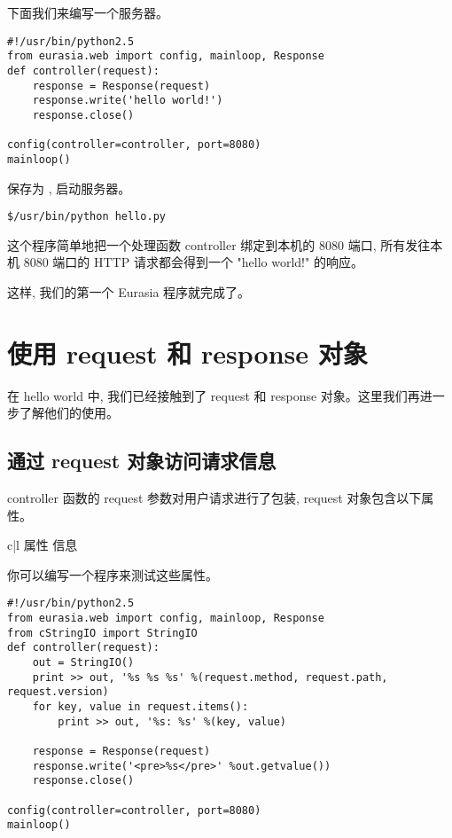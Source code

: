 \documentclass{manual}
\begin{document}
下面我们来编写一个服务器。

\begin{verbatim}
#!/usr/bin/python2.5
from eurasia.web import config, mainloop, Response
def controller(request):
	response = Response(request)
	response.write('hello world!')
	response.close()

config(controller=controller, port=8080)
mainloop()
\end{verbatim}

保存为 , 启动服务器。

\begin{verbatim}
$/usr/bin/python hello.py
\end{verbatim}

这个程序简单地把一个处理函数 controller 绑定到本机的 8080 端口, 所有发往本机 8080 端口的 HTTP 请求都会得到一个 "hello world!" 的响应。

这样, 我们的第一个 Eurasia 程序就完成了。

\section{使用 request 和 response 对象}

在 hello world 中, 我们已经接触到了 request 和 response 对象。这里我们再进一步了解他们的使用。

\subsection{通过 request 对象访问请求信息}

controller 函数的 request 参数对用户请求进行了包装, request 对象包含以下属性。

\begin{tableii}{c|l}{}{ 属性 }{ 信息 }
\end{tableii}

你可以编写一个程序来测试这些属性。

\begin{verbatim}
#!/usr/bin/python2.5
from eurasia.web import config, mainloop, Response
from cStringIO import StringIO
def controller(request):
	out = StringIO()
	print >> out, '%s %s %s' %(request.method, request.path, request.version)
	for key, value in request.items():
		print >> out, '%s: %s' %(key, value)

	response = Response(request)
	response.write('<pre>%s</pre>' %out.getvalue())
	response.close()

config(controller=controller, port=8080)
mainloop()
\end{verbatim}
\end{document}
